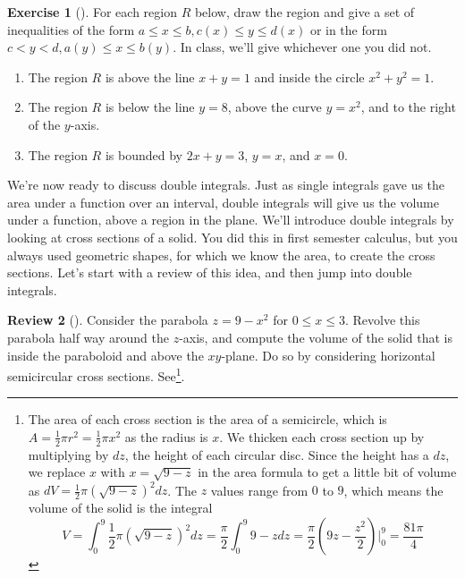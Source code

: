 \documentclass[10pt,]{book}
\theoremstyle{plain}
\theoremstyle{definition}
\theoremstyle{definition}
\theoremstyle{definition}
\newtheorem{project}{Review}[section]
\theoremstyle{definition}
\newtheorem{exploration}[project]{Exercise}
\theoremstyle{definition}
\numberwithin{equation}{section}
\newcommand{\lt}{<}
\begin{document}
\begin{exploration}[]\label{exploration-245}
For each region \(R\) below, draw the region and give a set of inequalities of the form \(a\leq x\leq b, c(x)\leq y\leq d(x)\) or in the form \(c\lt y\lt d, a(y)\leq x\leq b(y)\). In class, we'll give whichever one you did not.%
\begin{enumerate}[font=\bfseries,label=(\alph*),ref=\alph*]
\item\label{task-671} The region \(R\) is above the line \(x+y=1\) and inside the circle \(x^2+y^2=1\).%
\item\label{task-672} The region \(R\) is below the line \(y=8\), above the curve \(y=x^2\), and to the right of the \(y\)-axis.%
\item\label{task-673} The region \(R\) is bounded by \(2x+y=3\), \(y=x\), and \(x=0\).%
\end{enumerate}
\end{exploration}
We're now ready to discuss double integrals. Just as single integrals gave us the area under a function over an interval, double integrals will give us the volume under a function, above a region in the plane. We'll introduce double integrals by looking at cross sections of a solid. You did this in first semester calculus, but you always used geometric shapes, for which we know the area, to create the cross sections. Let's start with a review of this idea, and then jump into double integrals.%
\begin{project}[]\label{project-24}
Consider the parabola \(z=9-x^2\) for \(0\leq x\leq 3\). Revolve this parabola half way around the \(z\)-axis, and compute the volume of the solid that is inside the paraboloid and above the \(xy\)-plane. Do so by considering horizontal semicircular cross sections. See\footnote{The area of each cross section is the area of a semicircle, which is \(A=\frac{1}{2}\pi r^2 = \frac12 \pi x^2\) as the radius is \(x\). We thicken each cross section up by multiplying by \(dz\), the height of each circular disc. Since the height has a \(dz\), we replace \(x\) with \(x=\sqrt{9-z}\) in the area formula to get a little bit of volume as \(dV = \frac{1}{2}\pi (\sqrt{9-z})^2 dz\).  The \(z\) values range from \(0\) to \(9\), which means the volume of the solid is the integral%
\begin{equation*}
V
=\int_0^9 \frac{1}{2}\pi (\sqrt{9-z})^2 dz
=\frac{\pi}{2}\int_0^9  9-z dz
=\frac{\pi}{2}  \left(9z-\frac{z^2}{2}\right)\bigg|_0^9
=\frac{81\pi}{4}
\end{equation*}
\label{fn-9}}.%
\end{project}
\end{document}
